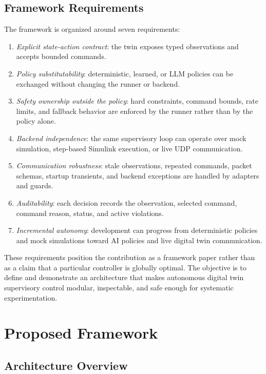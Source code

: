 \documentclass[conference]{IEEEtran}
\begin{document}
\subsection{Framework Requirements}

The framework is organized around seven requirements:
\begin{enumerate}
    \item \emph{Explicit state-action contract}: the twin exposes typed
    observations and accepts bounded commands.
    \item \emph{Policy substitutability}: deterministic, learned, or LLM
    policies can be exchanged without changing the runner or backend.
    \item \emph{Safety ownership outside the policy}: hard constraints,
    command bounds, rate limits, and fallback behavior are enforced by the
    runner rather than by the policy alone.
    \item \emph{Backend independence}: the same supervisory loop can operate
    over mock simulation, step-based Simulink execution, or live UDP
    communication.
    \item \emph{Communication robustness}: stale observations, repeated
    commands, packet schemas, startup transients, and backend exceptions are
    handled by adapters and guards.
    \item \emph{Auditability}: each decision records the observation,
    selected command, command reason, status, and active violations.
    \item \emph{Incremental autonomy}: development can progress from
    deterministic policies and mock simulations toward AI policies and live
    digital twin communication.
\end{enumerate}

These requirements position the contribution as a framework paper rather than
as a claim that a particular controller is globally optimal. The objective is
to define and demonstrate an architecture that makes autonomous digital twin
supervisory control modular, inspectable, and safe enough for systematic
experimentation.

\section{Proposed Framework}

\subsection{Architecture Overview}
\end{document}
